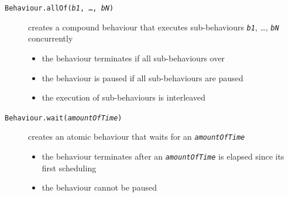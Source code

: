 \documentclass[presentation]{beamer}\mode<presentation>{\usetheme{AMSCesenaPurpleAndGold}}
\begin{document}
\begin{frame}[allowframebreaks]
\begin{description}
        \vspace{.20cm}

        \item[\texttt{{\small{}Behaviour.}allOf(\textit{b1}, \ldots, \textit{bN})}] creates a compound behaviour that executes sub-behaviours \texttt{\textit{b1}}, \ldots, \texttt{\textit{bN}} \alert{concurrently}
        \begin{itemize}\small
            \item the behaviour terminates if \alert{all} sub-behaviours over
            \item the behaviour is paused if all sub-behaviours are paused
            \item the execution of sub-behaviours is interleaved
        \end{itemize}

        \vspace{.20cm}

        \item[\texttt{{\small{}Behaviour.}wait(\textit{amountOfTime})}] creates an atomic behaviour that waits for an  \texttt{\textit{amountOfTime}}
        \begin{itemize}\small
            \item the behaviour terminates after an \texttt{\textit{amountOfTime}} is elapsed since its first scheduling
            \item the behaviour cannot be paused
        \end{itemize}


\end{description}
\end{frame}
\end{document}
